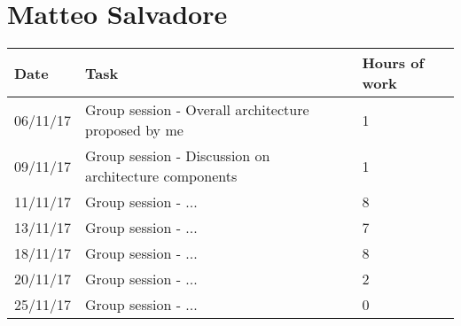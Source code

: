 \section{Matteo Salvadore}
\begin{table}[H]
	\begin{tabular}{ p{2cm} p{10cm} p{3cm}}
	Date & Task & Hours of work\\
	\hline
	06/11/17 & Group session - Overall architecture proposed by me & 1 \\
	09/11/17 & Group session - Discussion on architecture components & 1 \\
	11/11/17 & Group session - ... & 8 \\
	13/11/17 & Group session - ... & 7 \\
	18/11/17 & Group session - ... & 8 \\
	20/11/17 & Group session - ... & 2 \\
	25/11/17 & Group session - ... & 0 \\
	\end{tabular}
\end{table}